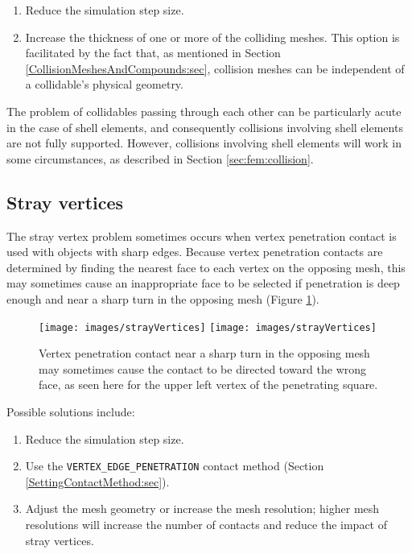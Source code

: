 \begin{enumerate}

\item Reduce the simulation step size.

\item Increase the thickness of one or more of the colliding meshes.
This option is facilitated by the fact that, as mentioned in Section
\ref{CollisionMeshesAndCompounds:sec}, collision meshes can be independent
of a collidable's physical geometry.

\end{enumerate}

\begin{sideblock}
The problem of collidables passing through each other can be
particularly acute in the case of shell elements, and consequently
collisions involving shell elements are not fully supported.  However,
collisions involving shell elements will work in some circumstances,
as described in Section \ref{sec:fem:collision}.
\end{sideblock}

\subsection{Stray vertices}

The stray vertex problem sometimes occurs when vertex penetration
contact is used with objects with sharp edges. Because vertex
penetration contacts are determined by finding the nearest face to
each vertex on the opposing mesh, this may sometimes cause an
inappropriate face to be selected if penetration is deep enough and
near a sharp turn in the opposing mesh (Figure
\ref{strayVertices:fig}).

\begin{figure}[ht]
\begin{center}
\iflatexml
 \texttt{[image: images/strayVertices]}
\else
 \texttt{[image: images/strayVertices]}
\fi
\end{center}
\caption{Vertex penetration contact near a sharp turn in the
opposing mesh may sometimes cause the contact to be directed toward
the wrong face, as seen here for the upper left vertex of the
penetrating square.}
\label{strayVertices:fig}
\end{figure}

Possible solutions include:

\begin{enumerate}

\item Reduce the simulation step size.

\item Use the {\tt VERTEX\_EDGE\_PENETRATION} contact method (Section
\ref{SettingContactMethod:sec}).

\item Adjust the mesh geometry or increase the mesh resolution;
higher mesh resolutions will increase the number of contacts
and reduce the impact of stray vertices.

\end{enumerate}

